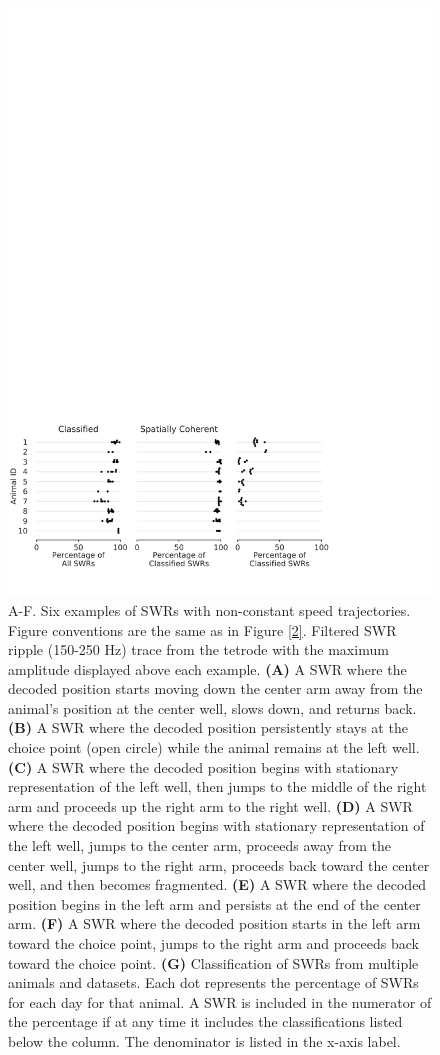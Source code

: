 \documentclass[times, twoside]{zHenriquesLab-StyleBioRxiv}
\begin{document}
\begin{figure}%
\centering
\includegraphics[width=0.80\linewidth]{figures/Figure3/Figure3_v5}
\caption{A-F. Six examples of SWRs with non-constant speed trajectories. Figure conventions are the same as in Figure \ref{2}. Filtered SWR ripple (150-250 Hz) trace from the tetrode with the maximum amplitude displayed above each example. \textbf{(A)} A SWR where the decoded position starts moving down the center arm away from the animal's position at the center well, slows down, and returns back. \textbf{(B)} A SWR where the decoded position persistently stays at the choice point (open circle) while the animal remains at the left well. \textbf{(C)} A SWR where the decoded position begins with stationary representation of the left well, then jumps to the middle of the right arm and proceeds up the right arm to the right well. \textbf{(D)} A SWR where the decoded position begins with stationary representation of the left well, jumps to the center arm, proceeds away from the center well, jumps to the right arm, proceeds back toward the center well, and then becomes fragmented. \textbf{(E)} A SWR where the decoded position begins in the left arm and persists at the end of the center arm. \textbf{(F)} A SWR where the decoded position starts in the left arm toward the choice point, jumps to the right arm and proceeds back toward the choice point. \textbf{(G)} Classification of SWRs from multiple animals and datasets. Each dot represents the percentage of SWRs for each day for that animal. A SWR is included in the numerator of the percentage if at any time it includes the classifications listed below the column. The denominator is listed in the x-axis label.
}
\label{3}
\end{figure}
\end{document}
